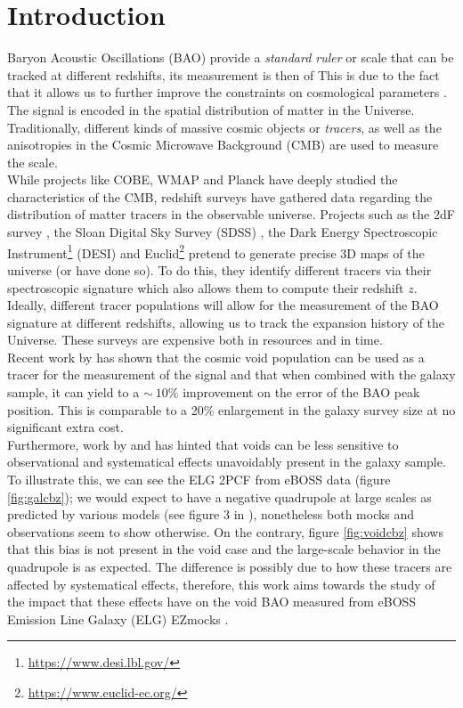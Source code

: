 \documentclass[fleqn, usenatbib]{mnras}
\begin{document}


\section{Introduction}
Baryon Acoustic Oscillations (BAO) provide a \textit{standard ruler} or scale that can be tracked at different redshifts, its measurement is then of This is due to the fact that it allows us to further improve the constraints on cosmological parameters \citep{Bassett2010}. The signal is encoded in the spatial distribution of matter in the Universe. Traditionally, different kinds of massive cosmic objects or \textit{tracers}, as well as the anisotropies in the Cosmic Microwave Background (CMB) are used to measure the scale.\\
While projects like COBE, WMAP and Planck have deeply studied the characteristics of the CMB, redshift surveys have gathered data regarding the distribution of matter tracers in the observable universe. Projects such as the 2dF survey \citep{Colless2001}, the Sloan Digital Sky Survey (SDSS) \citep{Dawson2015}, the Dark Energy Spectroscopic Instrument\footnote{\url{https://www.desi.lbl.gov/}} (DESI) and Euclid\footnote{\url{https://www.euclid-ec.org/}} pretend to generate precise 3D maps of the universe (or have done so). To do this, they identify different tracers via their spectroscopic signature which also allows them to compute their redshift $z$. Ideally, different tracer populations will allow for the measurement of the BAO signature at different redshifts, allowing us to track the expansion history of the Universe. These surveys are expensive both in resources and in time.\\
Recent work by \citet{Zhao2019} has shown that the cosmic void population can be used as a tracer for the measurement of the signal and that when combined with the galaxy sample, it can yield to a $\sim~10\%$ improvement on the error of the BAO peak position. This is comparable to a 20\% enlargement in the galaxy survey size at no significant extra cost.\\
Furthermore, work by \citet{Kitaura2016} and \citet{Liang2016} has hinted that voids can be less sensitive to observational and systematical effects unavoidably present in the galaxy sample. To illustrate this, we can see the ELG 2PCF from eBOSS data (figure \ref{fig:galcbz}); we would expect to have a negative quadrupole at large scales as predicted by various models (see figure 3 in \citet{White2015}), nonetheless both mocks and observations seem to show otherwise. On the contrary, figure \ref{fig:voidcbz} shows that this bias is not present in the void case and the large-scale behavior in the quadrupole is as expected. The difference is possibly due to how these tracers are affected by systematical effects, therefore, this work aims towards the study of the impact that these effects have on the void BAO measured from eBOSS Emission Line Galaxy (ELG) EZmocks \citep{Chuang2015a, Zhao2020}.\\
\end{document}
